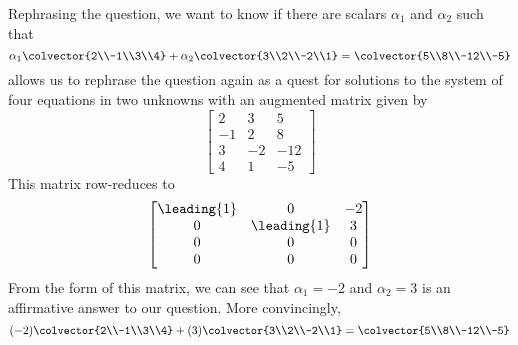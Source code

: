 Rephrasing the question, we want to know if there are scalars $\alpha_1$ and $\alpha_2$ such that
%
\begin{equation*}
\alpha_1\colvector{2\\-1\\3\\4}+\alpha_2\colvector{3\\2\\-2\\1}=\colvector{5\\8\\-12\\-5}
\end{equation*}
%
 allows us to rephrase the question again as a quest for solutions to the system of four equations in two unknowns with an augmented matrix given by
%
\begin{equation*}
\begin{bmatrix}
2 & 3 & 5\\
-1 & 2 & 8\\
3 & -2 & -12\\
4 &  1 & -5
\end{bmatrix}
\end{equation*}
%
This matrix row-reduces to
%
\begin{equation*}
\begin{bmatrix}
\leading{1} & 0 & -2\\
0 & \leading{1} & 3\\ 
0 & 0 & 0\\ 
0 & 0 & 0
\end{bmatrix}
\end{equation*}
%
From the form of this matrix, we can see that $\alpha_1=-2$ and $\alpha_2=3$ is an affirmative answer to our question.  More convincingly,
%
\begin{equation*}
(-2)\colvector{2\\-1\\3\\4}+(3)\colvector{3\\2\\-2\\1}=\colvector{5\\8\\-12\\-5}
\end{equation*}